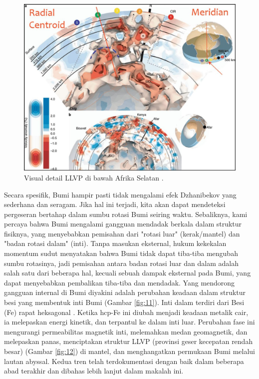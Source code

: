 \documentclass[10pt,twocolumn,letterpaper]{article}
\begin{document}
\begin{figure}[t]
\begin{center}
   \includegraphics[width=1\linewidth]{llvp.jpg}
\end{center}
   \caption{Visual detail LLVP di bawah Afrika Selatan \cite{28}.}
\label{fig:12}
\label{fig:onecol}
\end{figure}

Secara spesifik, Bumi hampir pasti tidak mengalami efek Dzhanibekov yang sederhana dan seragam. Jika hal ini terjadi, kita akan dapat mendeteksi pergeseran bertahap dalam sumbu rotasi Bumi seiring waktu. Sebaliknya, kami percaya bahwa Bumi mengalami gangguan mendadak berkala dalam struktur fisiknya, yang menyebabkan pemisahan dari "rotasi luar" (kerak/mantel) dan "badan rotasi dalam" (inti). Tanpa masukan eksternal, hukum kekekalan momentum sudut menyatakan bahwa Bumi tidak dapat tiba-tiba mengubah sumbu rotasinya, jadi pemisahan antara badan rotasi luar dan dalam adalah salah satu dari beberapa hal, kecuali sebuah dampak eksternal pada Bumi, yang dapat menyebabkan pembalikan tiba-tiba dan mendadak.
Yang mendorong gangguan internal di Bumi diyakini adalah perubahan keadaan dalam struktur besi yang membentuk inti Bumi (Gambar \ref{fig:11}). Inti dalam terdiri dari Besi (Fe) rapat heksagonal \cite{141}. Ketika hcp-Fe ini diubah menjadi keadaan metalik cair, ia melepaskan energi kinetik, dan terpantul ke dalam inti luar. Perubahan fase ini mengurangi permeabilitas magnetik inti, melemahkan medan geomagnetik, dan melepaskan panas, menciptakan struktur LLVP (provinsi geser kecepatan rendah besar) (Gambar \ref{fig:12}) \cite{38} di mantel, dan menghangatkan permukaan Bumi melalui lautan abyssal. Kedua tren telah terdokumentasi dengan baik dalam beberapa abad terakhir dan dibahas lebih lanjut dalam makalah ini.
\end{document}
